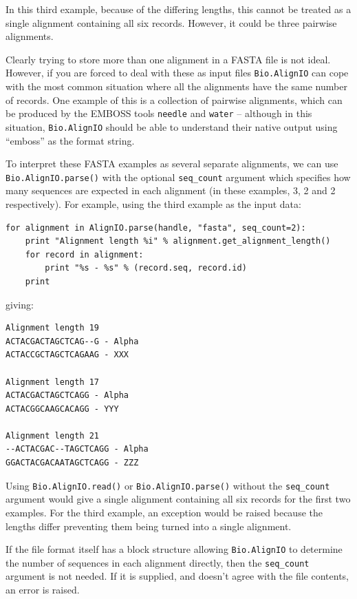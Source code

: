 \documentclass{report}
\begin{document}
\noindent In this third example, because of the differing lengths, this cannot be treated as a single alignment containing all six records.  However, it could be three pairwise alignments.

Clearly trying to store more than one alignment in a FASTA file is not ideal.  However, if you are forced to deal with these as input files \verb|Bio.AlignIO| can cope with the most common situation where all the alignments have the same number of records.
One example of this is a collection of pairwise alignments, which can be produced by the EMBOSS tools \verb|needle| and \verb|water| -- although in this situation, \verb|Bio.AlignIO| should be able to understand their native output using ``emboss'' as the format string.

To interpret these FASTA examples as several separate alignments, we can use \verb|Bio.AlignIO.parse()| with the optional \verb|seq_count| argument which specifies how many sequences are expected in each alignment (in these examples, 3, 2 and 2 respectively).
For example, using the third example as the input data:

\begin{verbatim}
for alignment in AlignIO.parse(handle, "fasta", seq_count=2):
    print "Alignment length %i" % alignment.get_alignment_length()
    for record in alignment:
        print "%s - %s" % (record.seq, record.id)
    print
\end{verbatim}

\noindent giving:

\begin{verbatim}
Alignment length 19
ACTACGACTAGCTCAG--G - Alpha
ACTACCGCTAGCTCAGAAG - XXX

Alignment length 17
ACTACGACTAGCTCAGG - Alpha
ACTACGGCAAGCACAGG - YYY

Alignment length 21
--ACTACGAC--TAGCTCAGG - Alpha
GGACTACGACAATAGCTCAGG - ZZZ
\end{verbatim}

Using \verb|Bio.AlignIO.read()| or \verb|Bio.AlignIO.parse()| without the \verb|seq_count| argument would give a single alignment containing all six records for the first two examples.  For the third example, an exception would be raised because the lengths differ preventing them being turned into a single alignment.

If the file format itself has a block structure allowing \verb|Bio.AlignIO| to determine the number of sequences in each alignment directly, then the \verb|seq_count| argument is not needed.  If it is supplied, and doesn't agree with the file contents, an error is raised.
\end{document}
